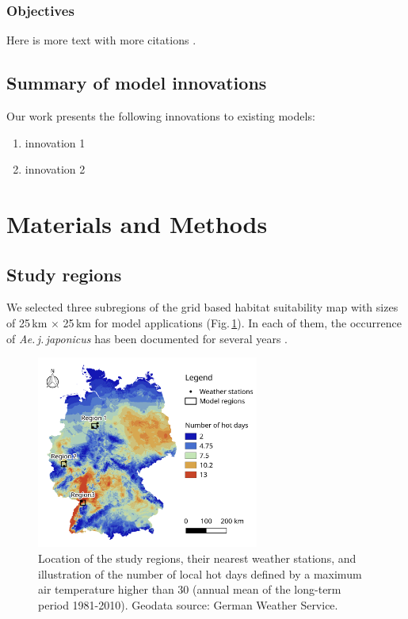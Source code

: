 \documentclass[%
a4paper,12pt,ngerman,UKenglish,twoside]{book}
\begin{document}
\begin{refsection}
\subsubsection{Objectives}
Here is more text with more citations \cite{yaremych_west_2004, deoya_high_2018}.

\subsection{Summary of model innovations} 
Our work presents the following innovations to existing models: 
\begin{enumerate}[label=(\roman*)]
\item innovation 1
\item  innovation 2
\end{enumerate}

\section{Materials and Methods}
\subsection{Study regions}\label{Chap:StudyRegions}
We selected three subregions of the grid based habitat suitability map with sizes of 25\,km $\times$ 25\,km for model applications (Fig.\,\ref{fig:RegionsInGermany}). In each of them, the occurrence of \textit{Ae.\,j.\,japonicus} has been documented for several years \cite{werner_further_2013, walther_citizen_2017}.

\begin{figure}[htb]
\centering
\includegraphics[width=0.65\textwidth]{WNV_Map.png}
\caption[Location of the study regions, their nearest weather stations, and illustration of the number of local hot days]{Location of the study regions, their nearest weather stations, and illustration of the number of local hot days defined by a maximum air temperature higher than 30\textcelsius{} (annual mean of the long-term period 1981-2010). Geodata source: German Weather Service.}
\label{fig:RegionsInGermany} 
\end{figure}


\end{refsection}
\end{document}
